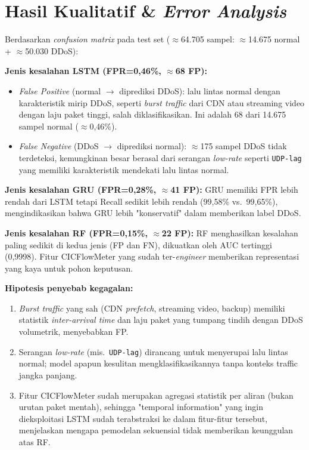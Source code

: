 \documentclass[11pt,a4paper,oneside]{report}
\begin{document}
\section{Hasil Kualitatif \& \textit{Error Analysis}}

Berdasarkan \textit{confusion matrix} pada test set ($\approx$64.705 sampel: $\approx$14.675 normal + $\approx$50.030 DDoS):

\textbf{Jenis kesalahan LSTM (FPR=0,46\%, $\approx$68 FP):}
\begin{itemize}[leftmargin=*]
    \item \textit{False Positive} (normal $\to$ diprediksi DDoS): lalu lintas normal dengan karakteristik mirip DDoS, seperti \textit{burst traffic} dari CDN atau streaming video dengan laju paket tinggi, salah diklasifikasikan. Ini adalah 68 dari 14.675 sampel normal ($\approx$0,46\%).
    \item \textit{False Negative} (DDoS $\to$ diprediksi normal): $\approx$175 sampel DDoS tidak terdeteksi, kemungkinan besar berasal dari serangan \textit{low-rate} seperti \texttt{UDP-lag} yang memiliki karakteristik mendekati lalu lintas normal.
\end{itemize}

\textbf{Jenis kesalahan GRU (FPR=0,28\%, $\approx$41 FP):} GRU memiliki FPR lebih rendah dari LSTM tetapi Recall sedikit lebih rendah (99,58\% vs.\ 99,65\%), mengindikasikan bahwa GRU lebih "konservatif" dalam memberikan label DDoS.

\textbf{Jenis kesalahan RF (FPR=0,15\%, $\approx$22 FP):} RF menghasilkan kesalahan paling sedikit di kedua jenis (FP dan FN), dikuatkan oleh AUC tertinggi (0,9998). Fitur CICFlowMeter yang sudah ter-\textit{engineer} memberikan representasi yang kaya untuk pohon keputusan.

\textbf{Hipotesis penyebab kegagalan:}
\begin{enumerate}[leftmargin=*]
    \item \textit{Burst traffic} yang sah (CDN \textit{prefetch}, streaming video, backup) memiliki statistik \textit{inter-arrival time} dan laju paket yang tumpang tindih dengan DDoS volumetrik, menyebabkan FP.
    \item Serangan \textit{low-rate} (mis.\ \texttt{UDP-lag}) dirancang untuk menyerupai lalu lintas normal; model apapun kesulitan mengklasifikasikannya tanpa konteks traffic jangka panjang.
    \item Fitur CICFlowMeter sudah merupakan agregasi statistik per aliran (bukan urutan paket mentah), sehingga "temporal information" yang ingin dieksploitasi LSTM sudah terabstraksi ke dalam fitur-fitur tersebut, menjelaskan mengapa pemodelan sekuensial tidak memberikan keunggulan atas RF.
\end{enumerate}
\end{document}
